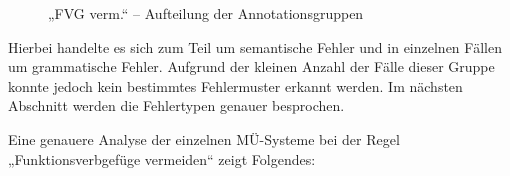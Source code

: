 \begin{figure}







\caption{\label{fig:05:36} „FVG verm.“ -- Aufteilung der Annotationsgruppen  }
\end{figure}


Hierbei handelte es sich zum Teil um semantische Fehler und in einzelnen Fällen um grammatische Fehler. Aufgrund der kleinen Anzahl der Fälle dieser Gruppe konnte jedoch kein bestimmtes Fehlermuster erkannt werden.  Im nächsten Abschnitt werden die Fehlertypen genauer besprochen.


Eine genauere Analyse der einzelnen MÜ-Systeme bei der Regel „Funktionsverbgefüge vermeiden“ zeigt Folgendes:



